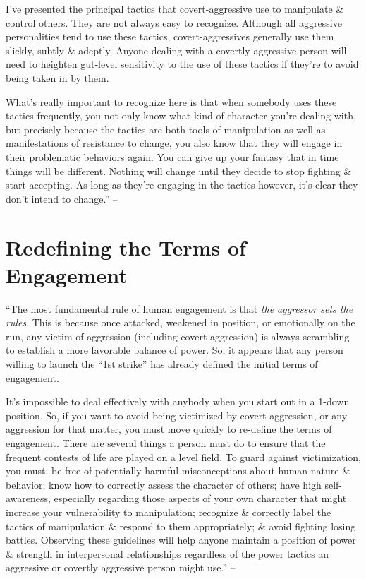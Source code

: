 \documentclass{article}
\numberwithin{equation}{section}
\begin{document}
I've presented the principal tactics that covert-aggressive use to manipulate \& control others. They are not always easy to recognize. Although all aggressive personalities tend to use these tactics, covert-aggressives generally use them slickly, subtly \& adeptly. Anyone dealing with a covertly aggressive person will need to heighten gut-level sensitivity to the use of these tactics if they're to avoid being taken in by them.

What's really important to recognize here is that when somebody uses these tactics frequently, you not only know what kind of character you're dealing with, but precisely because the tactics are both tools of manipulation as well as manifestations of resistance to change, you also know that they will engage in their problematic behaviors again. You can give up your fantasy that in time things will be different. Nothing will change until they decide to stop fighting \& start accepting. As long as they're engaging in the tactics however, it's clear they don't intend to change.'' -- \cite[pp. 91--112]{Simon2010}


\section{Redefining the Terms of Engagement}
``The most fundamental rule of human engagement is that \textit{the aggressor sets the rules}. This is because once attacked, weakened in position, or emotionally on the run, any victim of aggression (including covert-aggression) is always scrambling to establish a more favorable balance of power. So, it appears that any person willing to launch the ``1st strike'' has already defined the initial terms of engagement.

It's impossible to deal effectively with anybody when you start out in a 1-down position. So, if you want to avoid being victimized by covert-aggression, or any aggression for that matter, you must move quickly to re-define the terms of engagement. There are several things a person must do to ensure that the frequent contests of life are played on a level field. To guard against victimization, you must: be free of potentially harmful misconceptions about human nature \& behavior; know how to correctly assess the character of others; have high self-awareness, especially regarding those aspects of your own character that might increase your vulnerability to manipulation; recognize \& correctly label the tactics of manipulation \& respond to them appropriately; \& avoid fighting losing battles. Observing these guidelines will help anyone maintain a position of power \& strength in interpersonal relationships regardless of the power tactics an aggressive or covertly aggressive person might use.'' -- \cite[p. 113]{Simon2010}
\end{document}
